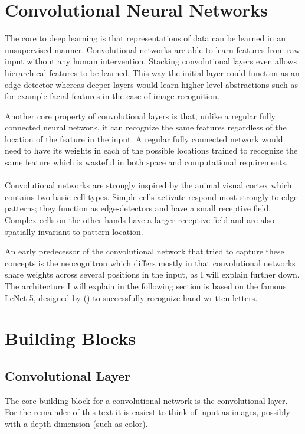

\section{Convolutional Neural Networks}
\label{sec:cnn}
The core to deep learning is that representations
of data can be learned in an unsupervised manner.
Convolutional networks are able to learn features
from raw input without any human intervention.
Stacking convolutional layers even allows
hierarchical features to be learned.
This way the initial layer could function
as an edge detector
whereas deeper layers
would learn higher-level abstractions
such as for example facial features
in the case of image recognition.

Another core property of convolutional layers is that,
unlike a regular fully connected neural network,
it can recognize the same features
regardless of the location of the feature in the input.
A regular fully connected network would need to have
its weights in each of the possible locations trained to recognize the same feature
which is wasteful in both space and computational requirements.

\paragraph{}
Convolutional networks are strongly inspired
by the animal visual cortex which contains two basic cell types.
Simple cells activate respond most strongly to edge patterns;
they function as edge-detectors and have a small receptive field.
Complex cells on the other hands have a larger receptive field
and are also spatially invariant to pattern location.

An early predecessor of the convolutional network
that tried to capture these concepts
is the neocognitron
\parencite{Fukushima1980}
which differs mostly in that convolutional networks
share weights across several positions in the input,
as I will explain further down.
The architecture I will explain in the following section
is based on the famous LeNet-5,
designed by
\citeauthor{LeCun1998}
(\citeyear{LeCun1998})
to successfully recognize hand-written letters.

\section{Building Blocks}
\label{sec:building_blocks}

\subsection{Convolutional Layer}
The core building block for a convolutional network
is the convolutional layer.
For the remainder of this text it is easiest
to think of input as images, possibly
with a depth dimension (such as color).

